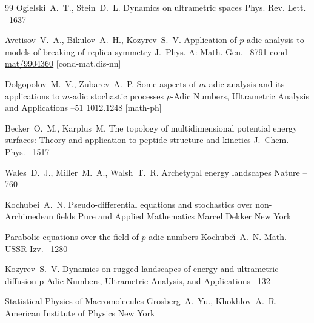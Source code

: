 \begin{thebibliography}{99}
\by Ogielski~A.~T., Stein~D.~L.
\paper Dynamics on ultrametric spaces
\jour Phys. Rev. Lett.
--1637

\by Avetisov~V.~A., Bikulov~A.~H., Kozyrev~S.~V.
\paper Application of $p$-adic analysis to models of breaking of replica symmetry
\jour J.~Phys. A: Math. Gen.
--8791
\moreref
\arxiv \href{http://arxiv.org/abs/cond-mat/9904360}{cond-mat/9904360} [cond-mat.dis-nn]

\by Dolgopolov~M.~V., Zubarev~A.~P.
\paper Some aspects of $m$-adic analysis and its applications to $m$-adic stochastic processes
\jour $p$-Adic Numbers, Ultrametric Analysis and Applications
--51
\moreref
\arxiv \href{http://arxiv.org/abs/1012.1248}{1012.1248} [math-ph]

\by Becker~O.~M., Karplus~M.
\paper The topology of multidimensional potential energy surfaces: Theory and application to peptide structure and kinetics
\jour J.~Chem. Phys.
--1517

\by Wales~D.~J., Miller~M.~A., Walsh~T.~R.
\paper Archetypal energy landscapes
\jour Nature
--760

\by Kochubei~A.~N.
\book Pseudo-differential equations and stochastics over non-Archimedean fields
\serial Pure and Applied Mathematics
\publ Marcel Dekker
\publaddr New York

\paper Parabolic equations over the field of $ p$-adic numbers
\by Kochube\u{\i}~A.~N. 
\jour Math. USSR-Izv.
--1280



\by Kozyrev~S.~V.
\paper Dynamics on rugged landscapes of energy and ultrametric diffusion
\jour p-Adic Numbers, Ultrametric Analysis, and Applications
--132

\book Statistical Physics of Macromolecules
\by Grosberg~A.~Yu., Khokhlov~A.~R.
\publ American Institute of Physics
\publaddr New York

\end{thebibliography}

\EngDate

\newpage

\Russian